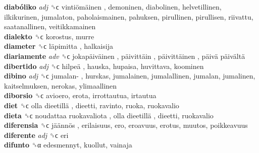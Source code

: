 \textbf{diabóliko} \emph{adj}  ␝ϲ   vintiömäinen , demoninen, diabolinen, helvetillinen, ilkikurinen, jumalaton, paholaismainen, pahuksen, pirullinen, pirullisen, riivattu, saatanallinen, veitikkamainen  \\
\textbf{dialekto} ␝ϲ  korostus, murre  \\
\textbf{diameter} ␝ϲ   läpimitta , halkaisija  \\
\textbf{diariamente} \emph{adv}  ␝ϲ   jokapäiväinen ,  päivittäin ,  päivittäinen ,  päivä päivältä   \\
\textbf{dibertido} \emph{adj}  ␝ϲ   hilpeä , hauska, hupaisa, huvittava, koominen  \\
\textbf{dibino} \emph{adj}  ␝ϲ   jumalan- , hurskas, jumalainen, jumalallinen, jumalan, jumalinen, kaitselmuksen, nerokas, ylimaallinen  \\
\textbf{diborsio} ␝ϲ  avioero, erota, irrottautua, irtautua  \\
\textbf{diet} ␝ϲ   olla dieetillä , dieetti, ravinto, ruoka, ruokavalio  \\
\textbf{dieta} ␝ϲ   noudattaa ruokavaliota ,  olla dieetillä , dieetti, ruokavalio  \\
\textbf{diferensia} ␝ϲ   jäännös , erilaisuus, ero, eroavuus, erotus, muutos, poikkeavuus  \\
\textbf{diferente} \emph{adj}  ␝ϲ  eri  \\
\textbf{difunto} ␝α  edesmennyt, kuollut, vainaja  \\
